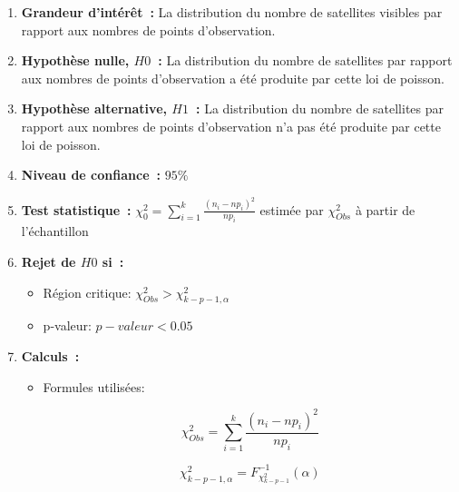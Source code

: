 \begin{enumerate}
    \item \textbf{Grandeur d'intérêt~:} La distribution du nombre de satellites visibles par rapport aux nombres de points d'observation.
    \vspace{.1cm}
   \item \textbf{Hypothèse nulle, $H0$~:} La distribution du nombre de satellites par rapport aux nombres de points d'observation a été produite par cette loi de poisson.
    \vspace{.1cm}
   \item \textbf{Hypothèse alternative, $H1$~:} La distribution du nombre de satellites par rapport aux nombres de points d'observation n'a pas été produite par cette loi de poisson.
    \vspace{.1cm}
   \item \textbf{Niveau de confiance~:} $95\%$
    \vspace{.1cm}
   \item \textbf{Test statistique~:} $\chi^{2}_{0} = \sum^{k}_{i=1} \frac{(n_{i} - np_{i})^{2}}{np_{i}}$ estimée par $\chi^{2}_{Obs}$ à partir de l'échantillon
    \vspace{.1cm}
   \item \textbf{Rejet de $H0$ si~:}
        \begin{itemize}
            \item Région critique: $\chi^{2}_{Obs} > \chi^{2}_{k-p-1, \alpha}$
            \item p-valeur: $p-valeur < 0.05$
        \end{itemize}

    \vspace{.1cm}
    \item \textbf{Calculs~:}
    \begin{itemize}
        \item Formules utilisées:
            \begin{figure}[!h]
                \centering
                \begin{minipage}{.48\linewidth}
                    \begin{equation}
                        \chi^{2}_{Obs} = \sum^{k}_{i=1} \frac{(n_{i} - np_{i})^{2}}{np_{i}}
                    \end{equation}
                \end{minipage}\hfill\vline
                \begin{minipage}{.48\linewidth}
                    \begin{equation}
                        \chi^{2}_{k-p-1, \alpha} = F^{-1}_{\chi^{2}_{k-p-1}}(\alpha)
                    \end{equation}
                \end{minipage}
            \end{figure}


\end{itemize}
\end{enumerate}
